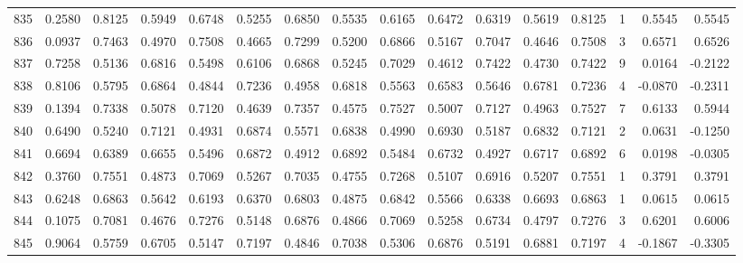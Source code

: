 \begin{tabular}{lrrrrrrrrrrrrrrr}
835 &      0.2580 &  0.8125 &  0.5949 &  0.6748 &  0.5255 &  0.6850 &  0.5535 &  0.6165 &  0.6472 &  0.6319 &   0.5619 &     0.8125 &      1 &                    0.5545 &                     0.5545 \\
836 &      0.0937 &  0.7463 &  0.4970 &  0.7508 &  0.4665 &  0.7299 &  0.5200 &  0.6866 &  0.5167 &  0.7047 &   0.4646 &     0.7508 &      3 &                    0.6571 &                     0.6526 \\
837 &      0.7258 &  0.5136 &  0.6816 &  0.5498 &  0.6106 &  0.6868 &  0.5245 &  0.7029 &  0.4612 &  0.7422 &   0.4730 &     0.7422 &      9 &                    0.0164 &                    -0.2122 \\
838 &      0.8106 &  0.5795 &  0.6864 &  0.4844 &  0.7236 &  0.4958 &  0.6818 &  0.5563 &  0.6583 &  0.5646 &   0.6781 &     0.7236 &      4 &                   -0.0870 &                    -0.2311 \\
839 &      0.1394 &  0.7338 &  0.5078 &  0.7120 &  0.4639 &  0.7357 &  0.4575 &  0.7527 &  0.5007 &  0.7127 &   0.4963 &     0.7527 &      7 &                    0.6133 &                     0.5944 \\
840 &      0.6490 &  0.5240 &  0.7121 &  0.4931 &  0.6874 &  0.5571 &  0.6838 &  0.4990 &  0.6930 &  0.5187 &   0.6832 &     0.7121 &      2 &                    0.0631 &                    -0.1250 \\
841 &      0.6694 &  0.6389 &  0.6655 &  0.5496 &  0.6872 &  0.4912 &  0.6892 &  0.5484 &  0.6732 &  0.4927 &   0.6717 &     0.6892 &      6 &                    0.0198 &                    -0.0305 \\
842 &      0.3760 &  0.7551 &  0.4873 &  0.7069 &  0.5267 &  0.7035 &  0.4755 &  0.7268 &  0.5107 &  0.6916 &   0.5207 &     0.7551 &      1 &                    0.3791 &                     0.3791 \\
843 &      0.6248 &  0.6863 &  0.5642 &  0.6193 &  0.6370 &  0.6803 &  0.4875 &  0.6842 &  0.5566 &  0.6338 &   0.6693 &     0.6863 &      1 &                    0.0615 &                     0.0615 \\
844 &      0.1075 &  0.7081 &  0.4676 &  0.7276 &  0.5148 &  0.6876 &  0.4866 &  0.7069 &  0.5258 &  0.6734 &   0.4797 &     0.7276 &      3 &                    0.6201 &                     0.6006 \\
845 &      0.9064 &  0.5759 &  0.6705 &  0.5147 &  0.7197 &  0.4846 &  0.7038 &  0.5306 &  0.6876 &  0.5191 &   0.6881 &     0.7197 &      4 &                   -0.1867 &                    -0.3305 \\

\end{tabular}
